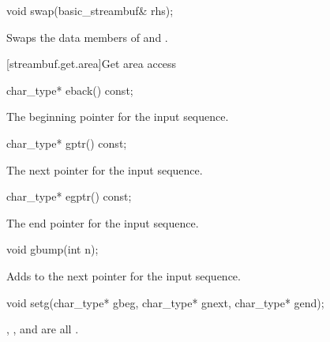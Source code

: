 %
\begin{itemdecl}
void swap(basic_streambuf& rhs);
\end{itemdecl}

\begin{itemdescr}
\pnum
\effects
Swaps the data members of 
and .
\end{itemdescr}

[streambuf.get.area]{Get area access}

%
\begin{itemdecl}
char_type* eback() const;
\end{itemdecl}

\begin{itemdescr}
\pnum
\returns
The beginning pointer for the input sequence.
\end{itemdescr}

%
\begin{itemdecl}
char_type* gptr() const;
\end{itemdecl}

\begin{itemdescr}
\pnum
\returns
The next pointer for the input sequence.
\end{itemdescr}

%
\begin{itemdecl}
char_type* egptr() const;
\end{itemdecl}

\begin{itemdescr}
\pnum
\returns
The end pointer for the input sequence.
\end{itemdescr}

%
\begin{itemdecl}
void gbump(int n);
\end{itemdecl}

\begin{itemdescr}
\pnum
\effects
Adds  to the next pointer for the input sequence.
\end{itemdescr}

%
\begin{itemdecl}
void setg(char_type* gbeg, char_type* gnext, char_type* gend);
\end{itemdecl}

\begin{itemdescr}
\pnum
\ensures
{},
,
and
 are all .
\end{itemdescr}

